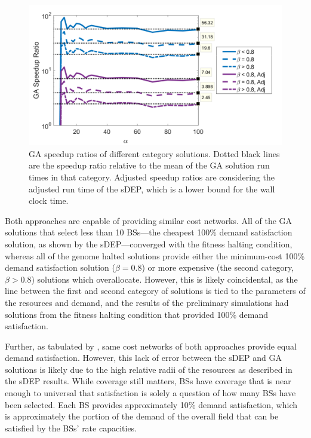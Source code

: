 \documentclass[12pt,dvipsnames]{report}
\begin{document}
\begin{figure}[ht]
	\centering
	\includegraphics[height=0.4\textheight]{Figures/CaseI_GASpeedupRatios2}
	\caption[Case I GA speedup ratios]{GA speedup ratios of different category solutions.  Dotted black lines are the speedup ratio relative to the mean of the GA solution run times in that category.  Adjusted speedup ratios are considering the adjusted run time of the sDEP, which is a lower bound for the wall clock time.}
	\label{fig:CaseI_GASpeedup}
\end{figure}

Both approaches are capable of providing similar cost networks.  All of the GA solutions that select less than 10 BSs---the cheapest 100\% demand satisfaction solution, as shown by the sDEP---converged with the fitness halting condition, whereas all of the genome halted solutions provide either the minimum-cost 100\% demand satisfaction solution ($\beta = 0.8$) or more expensive (the second category, $\beta > 0.8$) solutions which overallocate.  However, this is likely coincidental, as the line between the first and second category of solutions is tied to the parameters of the resources and demand, and the results of the preliminary simulations had solutions from the fitness halting condition that provided 100\% demand satisfaction.

Further, as tabulated by , same cost networks of both approaches provide equal demand satisfaction.  However, this lack of error between the sDEP and GA solutions is likely due to the high relative radii of the resources as described in the sDEP results.  While coverage still matters, BSs have coverage that is near enough to universal that satisfaction is solely a question of how many BSs have been selected.  Each BS provides approximately 10\% demand satisfaction, which is approximately the portion of the demand of the overall field that can be satisfied by the BSs' rate capacities.
\end{document}
